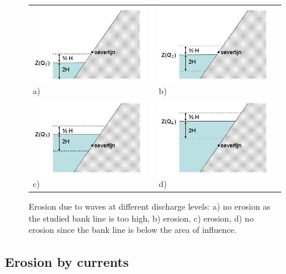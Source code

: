 \begin{figure}
\center
\begin{tabular}{p{6cm}p{6cm}}
\includegraphics[width=5cm]{figures/Fig4-6a.png} \linebreak
a) &
\includegraphics[width=5cm]{figures/Fig4-6b.png} \linebreak
b) \\
\includegraphics[width=5cm]{figures/Fig4-6c.png} \linebreak
c) &
\includegraphics[width=5cm]{figures/Fig4-6d.png} \linebreak
d) \\
\end{tabular}
\caption{Erosion due to waves at different discharge levels: a) no erosion as the studied bank line is too high, b) erosion, c) erosion, d) no erosion since the bank line is below the area of influence.}
\label{Fig4.6}
\end{figure}

\subsection{Erosion by currents}

